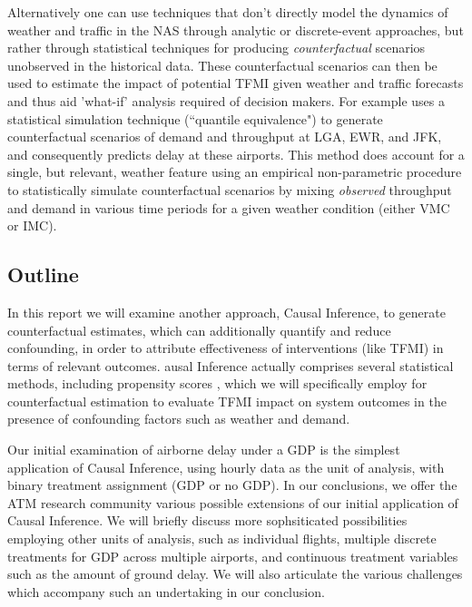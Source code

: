 \documentclass[conference]{IEEEtran}
\begin{document}

Alternatively one can use techniques that don't directly model the dynamics of weather and traffic in the NAS through analytic or discrete-event approaches, but rather through statistical techniques for producing \emph{counterfactual} scenarios unobserved in the historical data.  These counterfactual scenarios can then be used to estimate the impact of potential TFMI given weather and traffic forecasts and thus aid 'what-if' analysis required of decision makers.  For example \cite{kim2013} uses a statistical simulation technique (``quantile equivalence") to generate counterfactual scenarios of demand and throughput at LGA, EWR, and JFK, and consequently predicts delay at these airports.  This method does account for a single, but relevant, weather feature using an empirical non-parametric procedure to statistically simulate counterfactual scenarios by mixing \emph{observed} throughput and demand in various time periods for a given weather condition (either VMC or IMC).  


\subsection{Outline}
In this report we will examine another approach, Causal Inference, to generate counterfactual estimates, which can additionally quantify and reduce confounding, in order to attribute effectiveness of interventions (like TFMI) in terms of relevant outcomes. ausal Inference actually comprises several statistical methods, including propensity scores \cite{austin2011tutorial}, which we will specifically employ for counterfactual estimation to evaluate TFMI impact on system outcomes in the presence of confounding factors such as weather and demand.

Our initial examination of airborne delay under a GDP is the simplest application of Causal Inference, using hourly data as the unit of analysis, with binary treatment assignment (GDP or no GDP).  In our conclusions, we offer the ATM research community various possible extensions of our initial application of Causal Inference. We will briefly discuss more sophsiticated possibilities employing other units of analysis, such as individual flights, multiple discrete treatments for GDP across multiple airports, and continuous treatment variables such as the amount of ground delay.  We will also articulate the various challenges which accompany such an undertaking in our conclusion.  
\end{document}
